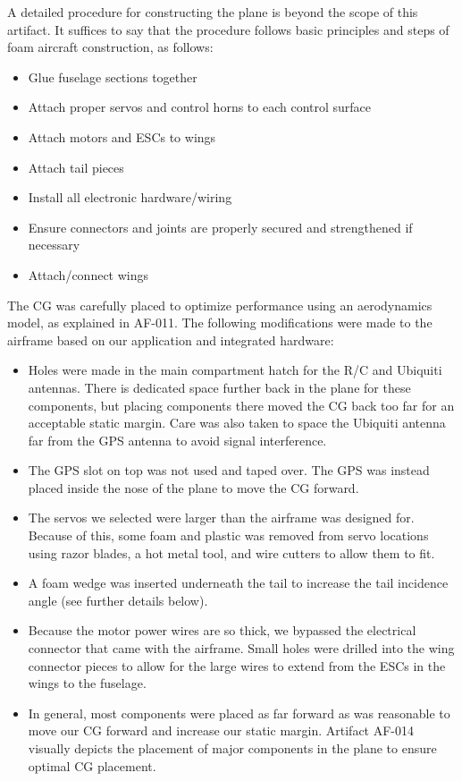 \documentclass[]{auvsi_doc}
\begin{document}
A detailed procedure for constructing the plane is beyond the scope of this artifact. It suffices to say that the procedure follows basic principles and steps of foam aircraft construction, as follows:

\begin{itemize}
	\item Glue fuselage sections together
	\item Attach proper servos and control horns to each control surface
	\item Attach motors and ESCs to wings
	\item Attach tail pieces
	\item Install all electronic hardware/wiring
	\item Ensure connectors and joints are properly secured and strengthened if necessary
	\item Attach/connect wings
\end{itemize}

The CG was carefully placed to optimize performance using an aerodynamics model, as explained in AF-011. The following modifications were made to the airframe based on our application and integrated hardware:

\begin{itemize}
	\item Holes were made in the main compartment hatch for the R/C and Ubiquiti antennas. There is dedicated space further back in the plane for these components, but placing components there moved the CG back too far for an acceptable static margin. Care was also taken to space the Ubiquiti antenna far from the GPS antenna to avoid signal interference.
	\item The GPS slot on top was not used and taped over. The GPS was instead placed inside the nose of the plane to move the CG forward.
	\item The servos we selected were larger than the airframe was designed for. Because of this, some foam and plastic was removed from servo locations using razor blades, a hot metal tool, and wire cutters to allow them to fit.
	\item A foam wedge was inserted underneath the tail to increase the tail incidence angle (see further details below).
	\item Because the motor power wires are so thick, we bypassed the electrical connector that came with the airframe. Small holes were drilled into the wing connector pieces to allow for the large wires to extend from the ESCs in the wings to the fuselage.
	\item In general, most components were placed as far forward as was reasonable to move our CG forward and increase our static margin. Artifact AF-014 visually depicts the placement of major components in the plane to ensure optimal CG placement. 
\end{itemize}
\end{document}
